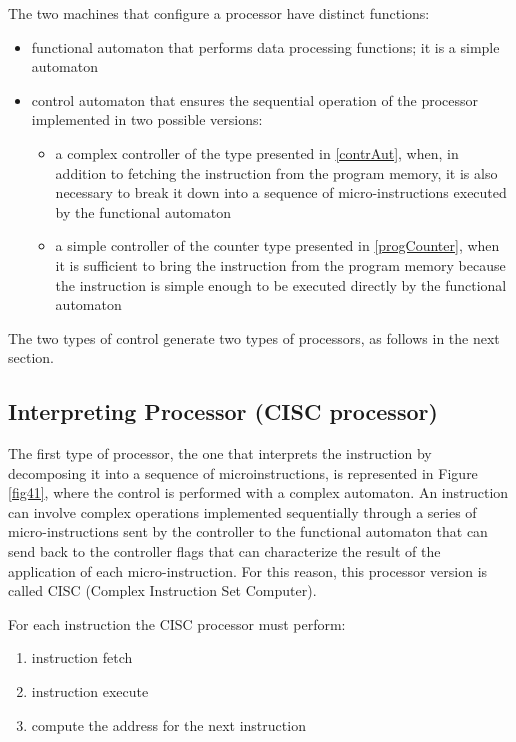 The two machines that configure a processor have distinct functions:


\begin{itemize}
    \item functional automaton that performs data processing functions; it is a simple automaton
    \item control automaton that ensures the sequential operation of the processor implemented in two possible versions:
        \begin{itemize}
            \item  a complex controller of the type presented in \ref{contrAut}, when, in addition to fetching the instruction from the program memory, it is also necessary to break it down into a sequence of micro-instructions executed by the functional automaton
            \item  a simple controller of the counter type presented in \ref{progCounter}, when it is sufficient to bring the instruction from the program memory because the instruction is simple enough to be executed directly by the functional automaton
        \end{itemize}
\end{itemize}

The two types of control generate two types of processors, as follows in the next section.

\subsection{Interpreting Processor (CISC processor)}

The first type of processor, the one that interprets the instruction by decomposing it into a sequence of microinstructions, is represented in Figure \ref{fig41}, where the control is performed with a complex automaton. An instruction can involve complex operations implemented sequentially through a series of micro-instructions sent by the controller to the functional automaton that can send back to the controller flags that can characterize the result of the application of each micro-instruction. For this reason, this processor version is called CISC (Complex Instruction Set Computer).


For each instruction the CISC processor must perform:
\begin{enumerate}
    \item instruction fetch
    \item instruction execute
    \item compute the address for the next instruction
\end{enumerate}


